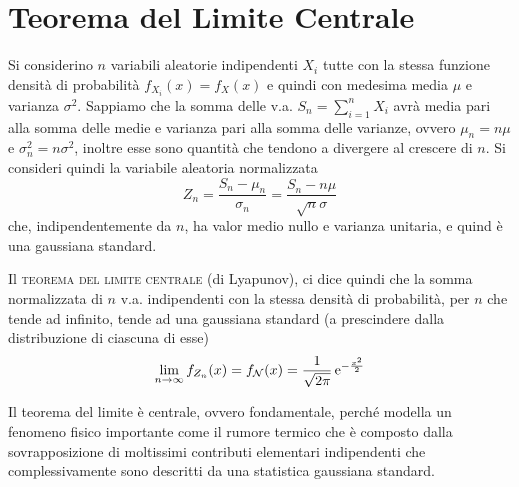 \section{Teorema del Limite Centrale}
Si considerino $n$ variabili aleatorie indipendenti $X_i$ tutte con la stessa funzione densità di probabilità $f_{X_i}(x)=f_X(x)$ e quindi con medesima media $\mu$ e varianza $\sigma^2$. Sappiamo che la somma delle v.a. $S_n=\sum_{i=1}^{n}X_i$ avrà media pari alla somma delle medie e varianza pari alla somma delle varianze, ovvero $\mu_n=n\mu$ e $\sigma^2_n=n\sigma^2$, inoltre esse sono quantità che tendono a divergere al crescere di $n$.
Si consideri quindi la variabile aleatoria normalizzata
\[
	Z_n=\frac{S_n-\mu_n}{\sigma_n}=\frac{S_n-n\mu}{\sqrt{n}\sigma}
\]
che, indipendentemente da $n$, ha valor medio nullo e varianza unitaria, e quind è una gaussiana standard.

Il \textsc{teorema del limite centrale} (di Lyapunov), ci dice quindi che la somma normalizzata di $n$ v.a. indipendenti con la stessa densità di probabilità, per $n$ che tende ad infinito, tende ad una gaussiana standard (a prescindere dalla distribuzione di ciascuna di esse)
\begin{equation}
	\lim\limits_{n\to\infty}f_{Z_n}(x)=f_\mathcal{N}(x)=\frac{1}{\sqrt{2\pi}}\operatorname{e}^{-\frac{x^2}{2}}
\end{equation}
\begin{nota}
	Il teorema del limite è centrale, ovvero fondamentale, perché modella un fenomeno fisico importante come il rumore termico che è composto dalla sovrapposizione di moltissimi contributi elementari indipendenti che complessivamente sono descritti da una statistica gaussiana standard.
\end{nota}
